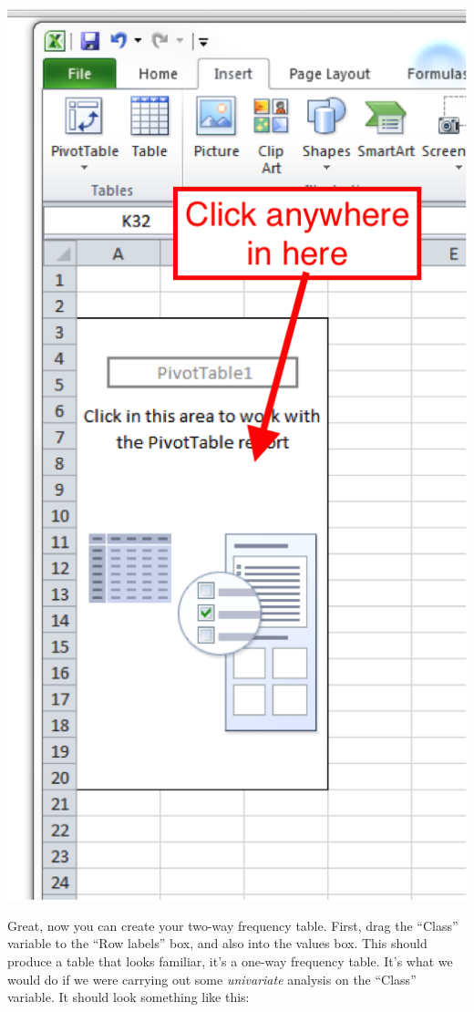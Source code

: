 \documentclass[]{book}
\theoremstyle{definition}
\theoremstyle{definition}
\theoremstyle{definition}
\theoremstyle{remark}
\begin{document}
\includegraphics{imgs/pivot_shell.png}

Great, now you can create your two-way frequency table. First, drag the
``Class'' variable to the ``Row labels'' box, and also into the values
box. This should produce a table that looks familiar, it's a one-way
frequency table. It's what we would do if we were carrying out some
\emph{univariate} analysis on the ``Class'' variable. It should look
something like this:
\end{document}
